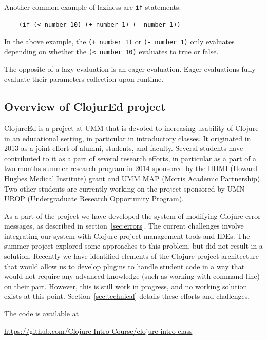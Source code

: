 \documentclass[12pt]{article}
\newcommand{\comment}[1]{{\bf \tt  {#1}}}
\newcommand{\emcomment}[1]{\textcolor{ForestGreen}{\comment{Elena: {#1}}}}
\begin{document}
Another common example of laziness are \texttt{if} statements:

\begin{verbatim}
	(if (< number 10) (+ number 1) (- number 1))
\end{verbatim}

In the above example, the \texttt{(+ number 1)} or \texttt{(- number 1)} only evaluates depending on
whether the \texttt{(< number 10)} evaluates to true or false.

The opposite of a lazy evaluation is an eager evaluation. Eager evaluations fully evaluate their
parameters collection upon runtime.


\subsection{Overview of ClojurEd project}\label{sec:project}
ClojureEd is a project at UMM that is devoted to increasing usability
of Clojure in an educational setting, in particular in introductory
classes. It originated in 2013 as a joint effort of alumni,
students, and faculty. Several students have contributed to it as a
part of several research efforts, in particular as a part of a two
months summer research program in 2014 sponsored by the HHMI (Howard
Hughes Medical Institute) grant and UMM MAP (Morris Academic Partnership). Two
other students are currently working on the project sponsored by UMN
UROP (Undergraduate Research Opportunity Program). 

As a part of the project we have developed the system of modifying
Clojure error messages, as described in section~\ref{sec:errors}. The
current challenges involve integrating our system with 
Clojure project management tools and IDEs. The summer project explored
some approaches to this problem, but did not result in a
solution. Recently we have identified elements of the Clojure project
architecture that would allow us to develop plugins to handle student
code in a way that would not require any advanced knowledge (such as
working with command line) on their part. However, this is still work
in progress, and no working solution exists at this
point. Section~\ref{sec:technical} details these efforts and
challenges. 

The code is available at

\noindent
\url{https://github.com/Clojure-Intro-Course/clojure-intro-class} 
\end{document}
